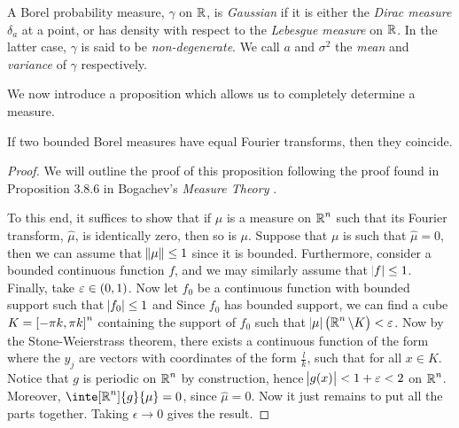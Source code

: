 \documentclass[../main.tex]{subfiles}
\begin{document}
\begin{definition}
\label{def:gauss_1d}
A Borel probability measure, $\gamma$ on $\operatorname{\mathbb{R}}$, is \emph{Gaussian} if it is either the \emph{Dirac measure} $\delta_a$ at a point, or has density  with respect to the \emph{Lebesgue measure} on $\operatorname{\mathbb{R}}$. In the latter case, $\gamma$ is said to be \emph{non-degenerate}. We call $a$ and $\sigma^2$ the \emph{mean} and \emph{variance} of $\gamma$ respectively.
\end{definition}
We now introduce a proposition which allows us to completely determine a measure.
\begin{proposition}
\label{prop:ft_equiv}
If two bounded Borel measures have equal Fourier transforms, then they coincide.
\end{proposition}
\begin{proof}
We will outline the proof of this proposition following the proof found in Proposition 3.8.6 in Bogachev's \textit{Measure Theory} \cite{Bogachev2007}. 

To this end, it suffices to show that if $\mu$ is a measure on $\operatorname{\mathbb{R}}^n$ such that its Fourier transform, $\hat{\mu}$, is identically zero, then so is $\mu$. Suppose that $\mu$ is such that $\hat{\mu} = 0$, then we can assume that $\norm{\mu}\leq 1$ since it is bounded. Furthermore, consider a bounded continuous function $f$, and we may similarly assume that $\abs{f}\leq 1$. Finally, take $\epsilon\in\intoo{0,1}$. Now let $f_0$ be a continuous function with bounded support such that $\abs{f_0}\leq 1$ and  Since $f_0$ has bounded support, we can find a cube $K = \intcc{-\pi k,\pi k}^n$ containing the support of $f_0$ such that $\abs{\mu }\del{\R^n\setminus K}<\epsilon$. Now by the Stone-Weierstrass theorem, there exists a continuous function of the form  where the $y_j$ are vectors with coordinates of the form $\frac{l}{k}$, such that  for all $x\in K$. Notice that $g$ is periodic on $\operatorname{\mathbb{R}}^n$ by construction, hence $\abs{g(x)}<1 + \varepsilon<2$ on $\operatorname{\mathbb{R}}^n$. Moreover, $\inte[\R^n]{g}{\mu } = 0$, since $\hat{\mu } = 0$. Now it just remains to put all the parts together.
 Taking $\epsilon\to 0$ gives the result.
\end{proof}
\end{document}
